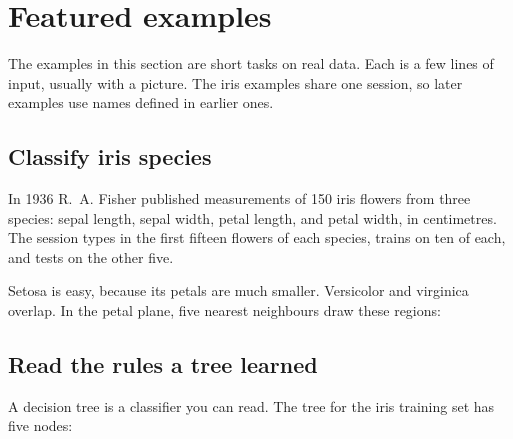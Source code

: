 \section{Featured examples}
\label{sec:ml-featured}

The examples in this section are short tasks on real data. Each is a few lines of
input, usually with a picture. The iris examples share one session, so later
examples use names defined in earlier ones.

\subsection*{Classify iris species}

In 1936 R.~A. Fisher published measurements of 150 iris flowers from three
species: sepal length, sepal width, petal length, and petal width, in
centimetres. The session types in the first fifteen flowers of each species,
trains on ten of each, and tests on the other five.

\begin{codepairs}
\end{codepairs}

Setosa is easy, because its petals are much smaller. Versicolor and virginica
overlap. In the petal plane, five nearest neighbours draw these regions:


\subsection*{Read the rules a tree learned}

A decision tree is a classifier you can read. The tree for the iris training set
has five nodes:

